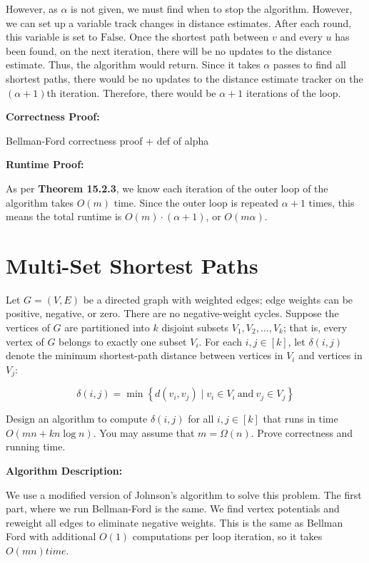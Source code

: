 \documentclass[11pt]{article}
\begin{document}
However, as $\alpha$ is not given, we must find when to stop the algorithm. However, we can set up a variable track changes in distance estimates. 
After each round, this variable is set to $\text{False}$. Once the shortest path between $v$ and every $u$ has been found, on the next iteration, 
there will be no updates to the distance estimate. Thus, the algorithm would return. Since it takes $\alpha$ passes to find all shortest paths, 
there would be no updates to the distance estimate tracker on the $(\alpha + 1)$th iteration. Therefore, there would be $\alpha + 1$ iterations 
of the loop.

\bigbreak

\textbf{Correctness Proof:}

Bellman-Ford correctness proof + def of alpha

\bigbreak

\textbf{Runtime Proof:}

As per \textbf{Theorem 15.2.3}, we know each iteration of the outer loop of the algorithm takes $O(m)$ time. 
Since the outer loop is repeated $\alpha + 1$ times, this means the total runtime is $O(m) \cdot (\alpha + 1)$, or $O(m \alpha)$.

\section{Multi-Set Shortest Paths}
Let $G = (V, E)$ be a directed graph with weighted edges; edge weights can be positive, negative, or zero. There are no negative-weight cycles. 
Suppose the vertices of $G$ are partitioned into $k$ disjoint subsets $V_1, V_2, \dots, V_k$; that is, 
every vertex of $G$ belongs to exactly one subset $V_i$. For each $i, j \in [k]$, let $\delta(i, j)$ 
denote the minimum shortest-path distance between vertices in $V_i$ and vertices in $V_j$:

$$\delta(i,j) = \min \left\{d(v_i, v_j) \mid v_i \in V_i\ \text{and}\ v_j \in V_j\right\}$$

Design an algorithm to compute $\delta(i,j)$ for all $i,j \in [k]$ that runs in time $O(mn + kn\log n)$. You may assume that $m = \Omega(n)$. 
Prove correctness and running time.

\bigbreak

\textbf{Algorithm Description:}

We use a modified version of Johnson's algorithm to solve this problem. The first part, where we run Bellman-Ford is the same. 
We find vertex potentials and reweight all edges to eliminate negative weights.
This is the same as Bellman Ford with additional $O(1)$ computations per loop iteration, so it takes $O(mn) time$.
\end{document}
